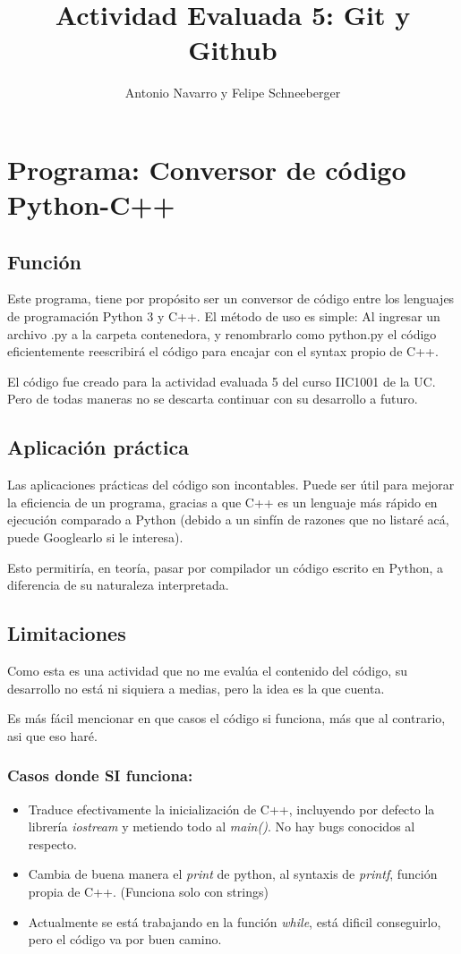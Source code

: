 \documentclass{article}
\title{Actividad Evaluada 5: Git y Github}
\author{Antonio Navarro y Felipe Schneeberger}
\date{}
\begin{document}
\maketitle

\section{Programa: Conversor de código Python-C++}
\subsection{Función}
Este programa, tiene por propósito ser un conversor de código entre los lenguajes de programación Python 3 y C++. El método de uso es simple: Al ingresar un archivo .py a la carpeta contenedora, y renombrarlo como python.py el código eficientemente reescribirá el código para encajar con el syntax propio de C++.\par
El código fue creado para la actividad evaluada 5 del curso IIC1001 de la UC. Pero de todas maneras no se descarta continuar con su desarrollo a futuro.
\subsection{Aplicación práctica}
Las aplicaciones prácticas del código son incontables. Puede ser útil para mejorar la eficiencia de un programa, gracias a que C++ es un lenguaje más rápido en ejecución comparado a Python (debido a un sinfín de razones que no listaré acá, puede Googlearlo si le interesa).\par
Esto permitiría, en teoría, pasar por compilador un código escrito en Python, a diferencia de su naturaleza interpretada.

\subsection{Limitaciones}
Como esta es una actividad que no me evalúa el contenido del código, su desarrollo no está ni siquiera a medias, pero la idea es la que cuenta.\par
Es más fácil mencionar en que casos el código si funciona, más que al contrario, asi que eso haré.\par
\subsubsection{Casos donde SI funciona:}
\begin{itemize}
    \item Traduce efectivamente la inicialización de C++, incluyendo por defecto la librería \textit{iostream} y metiendo todo al \textit{main()}. No hay bugs conocidos al respecto.
    \item Cambia de buena manera el \textit{print} de python, al syntaxis de \textit{printf}, función propia de C++. (Funciona solo con strings)
    \item Actualmente se está trabajando en la función \textit{while}, está dificil conseguirlo, pero el código va por buen camino.
\end{itemize}
\end{document}
